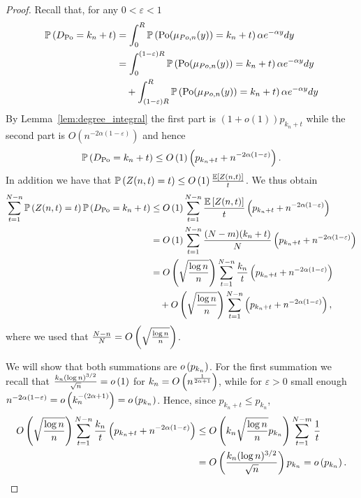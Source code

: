 \begin{proof}
Recall that, for any $0 < \varepsilon < 1$
\begin{align*}
	\mathbb{P}\left(D_{{\mathrm{Po}}} = k_n + t\right) &= \int_0^R \mathbb{P}\left({\mathrm{Po}}(\mu_{Po,n}(y)) = k_n+ t\right) \alpha e^{-\alpha y} dy\\
	&= \int_0^{(1-\varepsilon)R} \mathbb{P}\left({\mathrm{Po}}(\mu_{Po,n}(y)) = k_n+ t\right) \alpha e^{-\alpha y} dy \\
	&\hspace{10pt}+ \int_{(1-\varepsilon)R}^R \mathbb{P}\left({\mathrm{Po}}(\mu_{Po,n}(y)) = k_n+ t\right) \alpha e^{-\alpha y} dy
\end{align*}
By Lemma~\ref{lem:degree_integral} the first part is $(1+o(1)) p_{k_n + t}$ while the second part is $O(n^{-2\alpha(1-\varepsilon)})$ and hence
\[
	\mathbb{P}\left(D_{{\mathrm{Po}}} = k_n + t\right) \le O\left(1\right)\left(p_{k_n + t} + n^{-2\alpha(1-\varepsilon)}\right).
\]
In addition we have that $\mathbb{P}\left(Z(n,t) = t\right) \le O\left(1\right) \frac{\mathbb{E}\left[Z(n,t)\right]}{t}$. We thus obtain
\begin{align*}
	\sum_{t = 1}^{N-n} \mathbb{P}\left(Z(n,t) = t\right)\mathbb{P}\left(D_{{\mathrm{Po}}} = k_n + t\right)
	&\le O\left(1\right) \sum_{t = 1}^{N-n} \frac{\mathbb{E}\left[Z(n,t)\right]}{t}\left(p_{k_n + t} + n^{-2\alpha(1-\varepsilon)}\right)\\
	&= O\left(1\right) \sum_{t = 1}^{N-n} \frac{(N-m)(k_n + t)}{N}\left(p_{k_n + t} + n^{-2\alpha(1-\varepsilon)}\right)\\
	&= O\left(\sqrt{\frac{\log n}{n}}\right) \sum_{t = 1}^{N-n} \frac{k_n}{t}
		\left(p_{k_n + t} + n^{-2\alpha(1-\varepsilon)}\right)\\
	&\hspace{10pt}+ O\left(\sqrt{\frac{\log n}{n}}\right) \sum_{t = 1}^{N-n}
		\left(p_{k_n + t} + n^{-2\alpha(1-\varepsilon)}\right),
\end{align*}
where we used that $\frac{N-n}{N} = O\left(\sqrt{\frac{\log n}{n}}\right)$.

We will show that both summations are $o\left(p_{k_n}\right)$. For the first summation we recall that $\frac{k_n (\log n)^{3/2}}{\sqrt{n}} = o\left(1\right)$ for $k_n = O\left(n^{\frac{1}{2\alpha + 1}}\right)$, while for $\varepsilon > 0$ small enough $n^{-2\alpha(1-\varepsilon)} = o\left(k_n^{-(2\alpha + 1)}\right) = o\left(p_{k_n}\right)$. Hence, since $p_{k_n + t} \le p_{k_n}$,
\begin{align*}
	O\left(\sqrt{\frac{\log n}{n}}\right) \sum_{t = 1}^{N-n} \frac{k_n}{t}
		\left(p_{k_n + t} + n^{-2\alpha(1-\varepsilon)}\right)
	&\le O\left( k_n \sqrt{\frac{\log n}{n}} p_{k_n}\right) \sum_{t = 1}^{N - m} \frac{1}{t}\\
	&= O\left(\frac{k_n (\log n)^{3/2}}{\sqrt{n}}\right) p_{k_n} = o\left(p_{k_n}\right).
\end{align*}


\end{proof}

